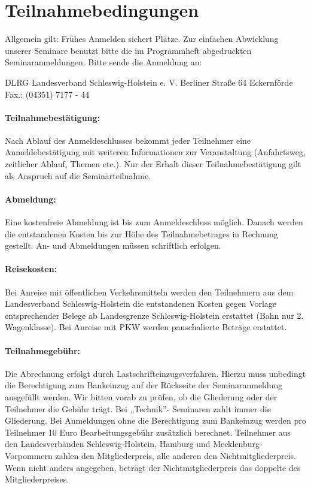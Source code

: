 \renewcommand\myheadingtext{Info}
\section*{Teilnahmebedingungen}
Allgemein gilt: Frühes Anmelden sichert Plätze. Zur einfachen Abwicklung unserer Seminare benutzt bitte die im Programmheft abgedruckten Seminaranmeldungen. Bitte sende die Anmeldung an:

DLRG Landesverband Schleswig-Holstein e. V.\newline
Berliner Straße 64 Eckernförde\newline
Fax.: (04351) 7177 - 44

\paragraph{Teilnahmebestätigung:}
Nach Ablauf des Anmeldeschlusses bekommt jeder Teilnehmer eine Anmeldebestätigung mit weiteren Informationen zur Veranstaltung (Anfahrtsweg, zeitlicher Ablauf, Themen etc.). 
Nur der Erhalt dieser Teilnahmebestätigung gilt als Anspruch auf die Seminarteilnahme.

\paragraph{Abmeldung:}
Eine kostenfreie Abmeldung ist bis zum Anmeldeschluss möglich. Danach werden die entstandenen Kosten bis zur Höhe des Teilnahmebetrages in Rechnung gestellt. 
An- und Abmeldungen müssen schriftlich erfolgen.

\paragraph{Reisekosten:}
Bei Anreise mit öffentlichen Verkehrsmitteln werden den Teilnehmern aus dem Landesverband Schleswig-Holstein die entstandenen Kosten gegen 
Vorlage entsprechender Belege ab Landesgrenze Schleswig-Holstein erstattet (Bahn nur 2. Wagenklasse). Bei Anreise mit PKW werden pauschalierte Beträge erstattet.

\paragraph{Teilnahmegebühr:}
Die Abrechnung erfolgt durch Lastschrifteinzugsverfahren. Hierzu muss unbedingt die Berechtigung zum Bankeinzug auf der Rückseite 
der Seminaranmeldung ausgefüllt werden. Wir bitten vorab zu prüfen, ob die Gliederung oder der Teilnehmer die Gebühr trägt. Bei „Technik”- Seminaren 
zahlt immer die Gliederung. Bei Anmeldungen ohne die Berechtigung zum Bankeinzug werden pro Teilnehmer 10 Euro Bearbeitungsgebühr zusätzlich berechnet. 
Teilnehmer aus den Landesverbänden Schleswig-Holstein, Hamburg und Mecklenburg-Vorpommern zahlen den Mitgliederpreis, alle anderen den Nichtmitgliederpreis. 
Wenn nicht anders angegeben, beträgt der Nichtmitgliederpreis das doppelte des Mitgliederpreises.

